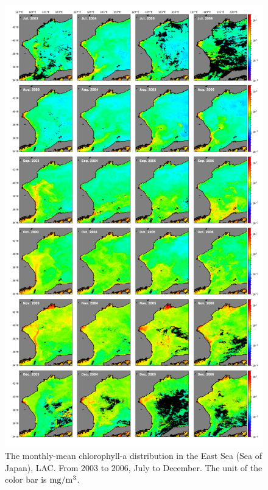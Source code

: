 \begin{figure}
	\centering
	\includegraphics[width=0.8\linewidth]{../images/noname02}
	\caption{The monthly-mean chlorophyll-a distribution in the East Sea (Sea of Japan), LAC. From 2003 to 2006, July to December. The unit of the color bar is $\rm mg/m^3$.}
	\label{fig:noname02}
\end{figure}

